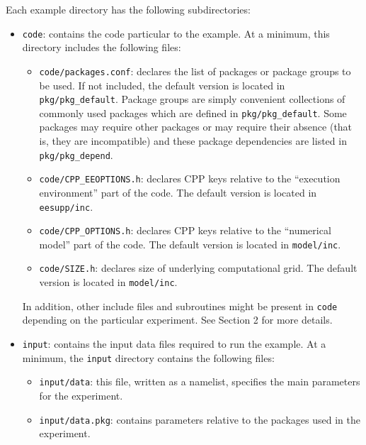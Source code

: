 Each example directory has the following subdirectories:

\begin{itemize}
\item \texttt{code}: contains the code particular to the example. At a
  minimum, this directory includes the following files:

  \begin{itemize}
  \item \texttt{code/packages.conf}: declares the list of packages or
    package groups to be used.  If not included, the default version
    is located in \texttt{pkg/pkg\_default}.  Package groups are
    simply convenient collections of commonly used packages which are
    defined in \texttt{pkg/pkg\_default}.  Some packages may require
    other packages or may require their absence (that is, they are
    incompatible) and these package dependencies are listed in
    \texttt{pkg/pkg\_depend}.

  \item \texttt{code/CPP\_EEOPTIONS.h}: declares CPP keys relative to
    the ``execution environment'' part of the code. The default
    version is located in \texttt{eesupp/inc}.
  
  \item \texttt{code/CPP\_OPTIONS.h}: declares CPP keys relative to
    the ``numerical model'' part of the code. The default version is
    located in \texttt{model/inc}.
  
  \item \texttt{code/SIZE.h}: declares size of underlying
    computational grid.  The default version is located in
    \texttt{model/inc}.
  \end{itemize}
  
  In addition, other include files and subroutines might be present in
  \texttt{code} depending on the particular experiment. See Section 2
  for more details.
  
\item \texttt{input}: contains the input data files required to run
  the example. At a minimum, the \texttt{input} directory contains the
  following files:

  \begin{itemize}
  \item \texttt{input/data}: this file, written as a namelist,
    specifies the main parameters for the experiment.
  
  \item \texttt{input/data.pkg}: contains parameters relative to the
    packages used in the experiment.
  

\end{itemize}
\end{itemize}
